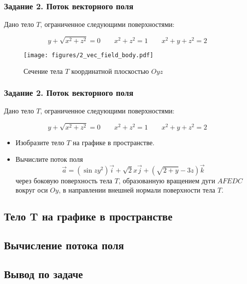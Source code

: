 \begin{frame}
	\frametitle{Задание 2. Поток векторного поля}

	Дано тело \(T\), ограниченное следующими поверхностями:

	\begin{equation*}
		y + \sqrt{x^2 + z^2} = 0 \qquad x^2+z^2 = 1 \qquad x^2 + y + z^2 = 2
	\end{equation*}

	\begin{figure}
		\centering
		\texttt{[image: figures/2\_vec\_field\_body.pdf]}
		\caption{Сечение тела \( T \) координатной плоскостью \(Oyz\) }\label{fig:task2_img}
	\end{figure}
\end{frame}

\begin{frame}
	\frametitle{Задание 2. Поток векторного поля}

	Дано тело \(T\), ограниченное следующими поверхностями:

	\begin{equation*}
		y + \sqrt{x^2 + z^2} = 0 \qquad x^2+z^2 = 1 \qquad x^2 + y + z^2 = 2
	\end{equation*}

	\begin{itemize}
		\item Изобразите тело \(T\) на графике в пространстве.
		\item Вычислите поток поля
		      \begin{equation*}
			      \vec a = (\sin zy^2) \vec i + \sqrt{2} x \vec j + (\sqrt{2+y} -3z) \vec k
		      \end{equation*}
		      через боковую поверхность тела \(T\), образованную вращением дуги \(AFEDC\)
		      вокруг оси \(Oy\), в направлении внешней нормали поверхности тела \(T\).
	\end{itemize}

\end{frame}

\subsection{Тело T на графике в пространстве}


\subsection{Вычисление потока поля}


\subsection{Вывод по задаче}


